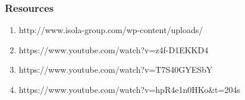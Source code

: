 \documentclass{beamer}
\begin{document}
	\begin{frame}
    \frametitle{Resources}
	
		\begin{enumerate}
			\item http://www.isola-group.com/wp-content/uploads/
			\item https://www.youtube.com/watch?v=z4f-D1EKKD4
			\item https://www.youtube.com/watch?v=T7S40GYESbY
			\item https://www.youtube.com/watch?v=hpR4e1n0HKo\&t=204s
		\end{enumerate}
	\end{frame}
\end{document}
